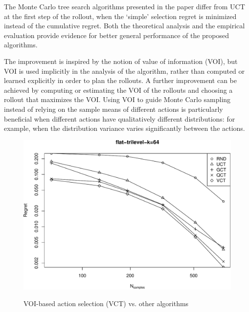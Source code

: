 \documentclass{article}
\begin{document}
The Monte Carlo tree search algorithms presented in the paper differ
from UCT at the first step of the rollout, when the `simple' selection
regret is minimized instead of the cumulative regret. Both the
theoretical analysis and the empirical evaluation provide evidence for
better general performance of the proposed algorithms.

The improvement is inspired by the notion of value of information (VOI),
but VOI is used implicitly in the analysis of the algorithm, rather
than computed or learned explicitly in order to plan the rollouts. A
further improvement can be achieved by computing or estimating the VOI
of the rollouts and choosing a rollout that maximizes the VOI. Using VOI
to guide Monte Carlo sampling instead of relying on the sample means
of different actions  is particularly beneficial when different
actions have qualitatively different distributions: for example, when the
distribution variance varies significantly between the actions.

\begin{figure}[t]
  \centering
  \includegraphics[scale=0.45,trim=0 0 0 16pt,clip]{flat-trilevel-vct-k=64.pdf}\\
  \caption{VOI-based action selection (VCT) vs. other algorithms}
  \label{fig:flat-trilevel-vct}
\end{figure}
\end{document}

